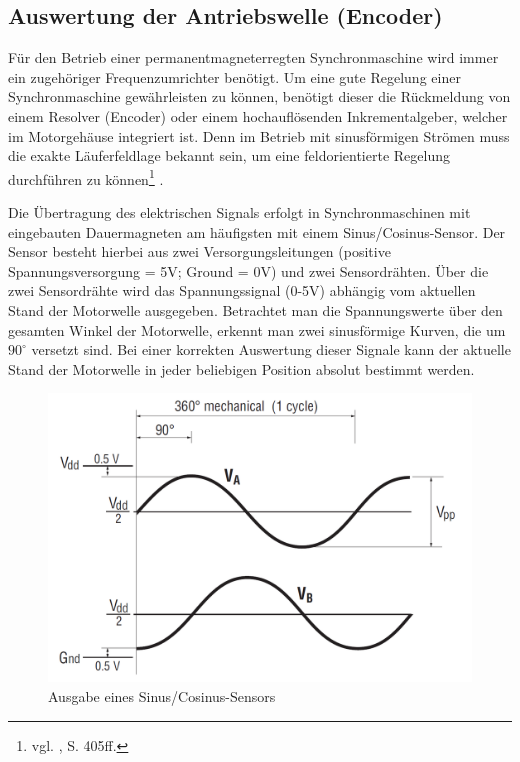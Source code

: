 	
\newpage

\subsection{Auswertung der Antriebswelle (Encoder)}
Für den Betrieb einer permanentmagneterregten Synchronmaschine wird immer ein zugehöriger Frequenzumrichter benötigt. Um eine gute Regelung einer Synchronmaschine gewährleisten zu können, benötigt dieser die Rückmeldung von einem Resolver (Encoder) oder einem hochauflösenden Inkrementalgeber, welcher im Motorgehäuse integriert ist. Denn im Betrieb mit sinusförmigen Strömen muss die exakte Läuferfeldlage bekannt sein, um eine feldorientierte Regelung durchführen zu können\footnote{vgl. \cite{Fischer}, S. 405ff.} .

Die Übertragung des elektrischen Signals erfolgt in Synchronmaschinen mit eingebauten Dauermagneten am häufigsten mit einem Sinus/Cosinus-Sensor. Der Sensor besteht hierbei aus zwei Versorgungsleitungen (positive Spannungsversorgung = 5V; Ground = 0V) und zwei Sensordrähten. Über die zwei Sensordrähte wird das Spannungssignal (0-5V) abhängig vom aktuellen Stand der Motorwelle ausgegeben. Betrachtet man die Spannungswerte über den gesamten Winkel der Motorwelle, erkennt man zwei sinusförmige Kurven, die um $90^\circ$ versetzt sind. Bei einer korrekten Auswertung dieser Signale kann der aktuelle Stand der Motorwelle in jeder beliebigen Position absolut bestimmt werden.
\\[8mm]
\begin{figure}[H]
	\begin{center}
		\includegraphics[scale=0.3]{figures/antrieb/SinCos_Sensor.png}
		\caption{Ausgabe eines Sinus/Cosinus-Sensors\cite{Manual}}
	\end{center}
\end{figure}



